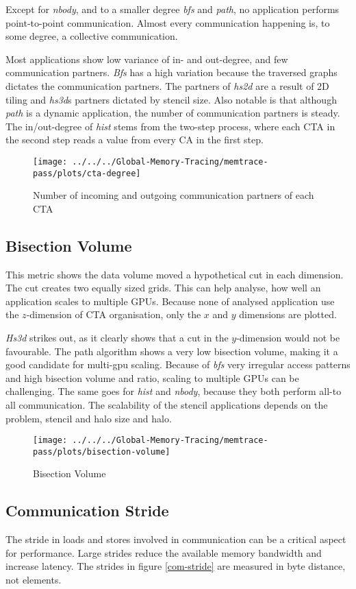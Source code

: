 Except for \textit{nbody}, and to a smaller degree \textit{bfs} and \textit{path}, no application performs point-to-point communication. Almost every communication happening is, to some degree, a collective communication.

Most applications show low variance of in- and out-degree, and few communication partners. \textit{Bfs} has a high variation because the traversed graphs dictates the communication partners. The partners of \textit{hs2d} are a result of 2D tiling and \textit{hs3d}s partners
dictated by stencil size. Also notable is that although \textit{path} is a dynamic application, the number of communication partners is steady. The in/out-degree of \textit{hist} stems from the two-step process, where each CTA in the second step reads a value from
every CA in the first step.

\begin{figure}[t]
	\texttt{[image: ../../../Global-Memory-Tracing/memtrace-pass/plots/cta-degree]}
	\caption{Number of incoming and outgoing communication partners of each CTA}
	\label{fig:Cta-degree}
\end{figure}
\subsection{Bisection Volume}
This metric shows the data volume moved a hypothetical cut in each dimension. The cut creates two equally sized grids. This can help analyse, how well an application scales to multiple GPUs. Because none of analysed application use the $z$-dimension of CTA organisation, only the $x$ and $y$ dimensions are plotted. 

\textit{Hs3d} strikes out, as it clearly shows that a cut in the $y$-dimension would not be favourable. The path algorithm shows a very low bisection volume, making it a good candidate for multi-gpu scaling.
Because of \textit{bfs} very irregular access patterns and high bisection volume and ratio, scaling to multiple GPUs can be challenging. The same goes for \textit{hist} and \textit{nbody}, because they both
perform all-to all communication. The scalability of the stencil applications depends on the problem, stencil and halo size and halo.
\begin{figure}[h!]
	\centering
	\texttt{[image: ../../../Global-Memory-Tracing/memtrace-pass/plots/bisection-volume]}
	\caption{Bisection Volume}
	\label{bisection-vols}
\end{figure}
\subsection{Communication Stride}
The stride in loads and stores involved in communication can be a critical aspect for performance. Large strides reduce the available memory bandwidth and increase latency. The strides in figure \ref{com-stride} are measured in byte distance, not elements.

